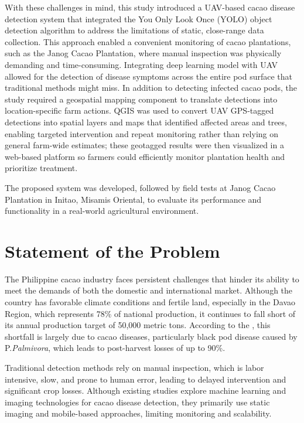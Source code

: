 {	With these challenges in mind, this study introduced a UAV-based cacao disease detection system that integrated the You Only Look Once (YOLO) object detection algorithm to address the limitations of static, close-range data collection. This approach enabled a convenient monitoring of cacao plantations, such as the Janog Cacao Plantation, where manual inspection was physically demanding and time-consuming. Integrating deep learning model with UAV allowed for the detection of disease symptoms across the entire pod surface that traditional methods might miss. In addition to detecting infected cacao pods, the study required a geospatial mapping component to translate detections into location-specific farm actions. QGIS was used to convert UAV GPS-tagged detections into spatial layers and maps that identified affected areas and trees, enabling targeted intervention and repeat monitoring rather than relying on general farm-wide estimates; these geotagged results were then visualized in a web-based platform so farmers could efficiently monitor plantation health and prioritize treatment.
	
	The proposed system was developed, followed by field tests at Janog Cacao Plantation in Initao, Misamis Oriental, to evaluate its performance and functionality in a real-world agricultural environment.

\section{Statement of the Problem}

The Philippine cacao industry faces persistent challenges that hinder its ability to meet the demands of both the domestic and international market. Although the country has favorable climate conditions and fertile land, especially in the Davao Region, which represents 78\% of national production, it continues to fall short of its annual production target of 50,000 metric tons. According to the \cite{PhilCacaoRoadmap2021}, this shortfall is largely due to cacao diseases, particularly black pod disease caused by P.\textit{Palmivora}, which leads to post-harvest losses of up to 90\%.

Traditional detection methods rely on manual inspection, which is labor intensive, slow, and prone to human error, leading to delayed intervention and significant crop losses. Although existing studies explore machine learning and imaging technologies for cacao disease detection, they primarily use static imaging and mobile-based approaches, limiting monitoring and scalability.

}
